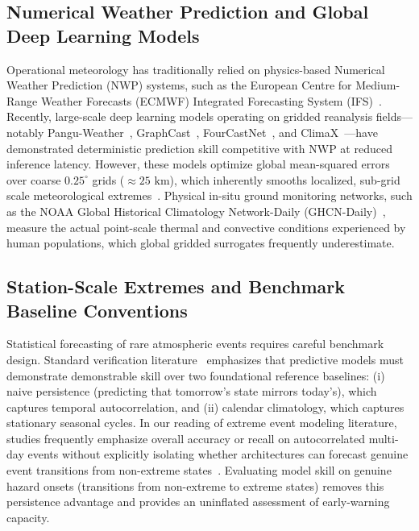\documentclass[conference]{IEEEtran}
\begin{document}
\subsection{Numerical Weather Prediction and Global Deep Learning Models}
Operational meteorology has traditionally relied on physics-based Numerical Weather Prediction (NWP) systems, such as the European Centre for Medium-Range Weather Forecasts (ECMWF) Integrated Forecasting System (IFS)~\cite{bauer2015quiet,hersbach2020}. Recently, large-scale deep learning models operating on gridded reanalysis fields---notably Pangu-Weather~\cite{bi2023}, GraphCast~\cite{lam2023}, FourCastNet~\cite{pathak2022}, and ClimaX~\cite{nguyen2023climax}---have demonstrated deterministic prediction skill competitive with NWP at reduced inference latency. However, these models optimize global mean-squared errors over coarse $0.25^\circ$ grids ($\approx 25\text{ km}$), which inherently smooths localized, sub-grid scale meteorological extremes~\cite{schultz2021,rasp2020weatherbench}. Physical in-situ ground monitoring networks, such as the NOAA Global Historical Climatology Network-Daily (GHCN-Daily)~\cite{menne2012}, measure the actual point-scale thermal and convective conditions experienced by human populations, which global gridded surrogates frequently underestimate.

\subsection{Station-Scale Extremes and Benchmark Baseline Conventions}
Statistical forecasting of rare atmospheric events requires careful benchmark design. Standard verification literature~\cite{wilks2011,brier1950,murphy1973} emphasizes that predictive models must demonstrate demonstrable skill over two foundational reference baselines: (i) naive persistence (predicting that tomorrow's state mirrors today's), which captures temporal autocorrelation, and (ii) calendar climatology, which captures stationary seasonal cycles. In our reading of extreme event modeling literature, studies frequently emphasize overall accuracy or recall on autocorrelated multi-day events without explicitly isolating whether architectures can forecast genuine event transitions from non-extreme states~\cite{wilks2011,chattopadhyay2020}. Evaluating model skill on genuine hazard onsets (transitions from non-extreme to extreme states) removes this persistence advantage and provides an uninflated assessment of early-warning capacity.
\end{document}
